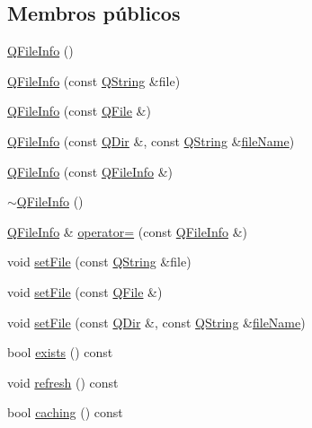 \subsection*{Membros públicos}
\begin{DoxyCompactItemize}
\item 
\hyperlink{class_q_file_info_a85c49f8c665182e20f432901aed4bf81}{Q\-File\-Info} ()
\item 
\hyperlink{class_q_file_info_a23eeabae289fea24836137c95e96313b}{Q\-File\-Info} (const \hyperlink{class_q_string}{Q\-String} \&file)
\item 
\hyperlink{class_q_file_info_ab51566ea6c1dfa2ca87f70c13f96a04b}{Q\-File\-Info} (const \hyperlink{class_q_file}{Q\-File} \&)
\item 
\hyperlink{class_q_file_info_aa6051f706626037b39e61f982e8fb8f2}{Q\-File\-Info} (const \hyperlink{class_q_dir}{Q\-Dir} \&, const \hyperlink{class_q_string}{Q\-String} \&\hyperlink{class_q_file_info_a5a82962b4e77435323352ef77597016a}{file\-Name})
\item 
\hyperlink{class_q_file_info_aa0f0ec159ffca9e684719627d5e93fe2}{Q\-File\-Info} (const \hyperlink{class_q_file_info}{Q\-File\-Info} \&)
\item 
\hyperlink{class_q_file_info_aa34eb7c777e14aba6bbb68b8492a41f9}{$\sim$\-Q\-File\-Info} ()
\item 
\hyperlink{class_q_file_info}{Q\-File\-Info} \& \hyperlink{class_q_file_info_a63800f2d9f6004a38cffc32d8428678e}{operator=} (const \hyperlink{class_q_file_info}{Q\-File\-Info} \&)
\item 
void \hyperlink{class_q_file_info_a7ea9c2d4349e2c0902c1b437e053b73b}{set\-File} (const \hyperlink{class_q_string}{Q\-String} \&file)
\item 
void \hyperlink{class_q_file_info_a282c5f1f7bbba85afe4b1c740672195a}{set\-File} (const \hyperlink{class_q_file}{Q\-File} \&)
\item 
void \hyperlink{class_q_file_info_a30f60dd7bc9b070cc8f890828ddcd1dd}{set\-File} (const \hyperlink{class_q_dir}{Q\-Dir} \&, const \hyperlink{class_q_string}{Q\-String} \&\hyperlink{class_q_file_info_a5a82962b4e77435323352ef77597016a}{file\-Name})
\item 
bool \hyperlink{class_q_file_info_a74bdced855aaba94868b77f21398775c}{exists} () const 
\item 
void \hyperlink{class_q_file_info_a2e63ff3187dd2bb1baee24e5985e06a2}{refresh} () const 
\item 
bool \hyperlink{class_q_file_info_adcf6ca90a112a65bdfc2a229ba476a99}{caching} () const 

\end{DoxyCompactItemize}
